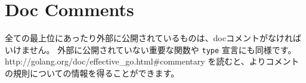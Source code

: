 \section{Doc Comments}

全ての最上位にあったり外部に公開されているものは、docコメントがなければいけません。 外部に公開されていない重要な関数や \texttt{type} 宣言にも同様です。 http:\//\//golang.org\//doc\//effective\_go.html\#commentary を読むと、よりコメントの規則についての情報を得ることができます。
